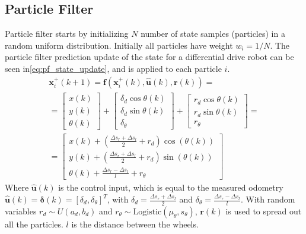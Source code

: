 \subsection{Particle Filter}
Particle filter starts by initializing $N$ number of state samples (particles) in a random uniform distribution. Initially all particles have weight $w_i = 1/N$\:\cite{corke_robotics_2023}.
The particle filter prediction update of the state for a differential drive robot can be seen in\:\eqref{eq:pf_state_update}, and is applied to each particle $i$\:\cite{corke_robotics_2023}.
\begin{equation}
    \label{eq:pf_state_update}
    \begin{split}
        \mathbf{x}_i^+(k+1) = \mathbf{f}(\mathbf{x}^+_i(k), \hat{\mathbf{u}}(k), \mathbf{r}(k)) = \\
        =
        \begin{bmatrix}
            x(k) \\
            y(k) \\
            \theta (k)
        \end{bmatrix}
        +
        \begin{bmatrix}
            \delta_d \cos{\theta(k)} \\
            \delta_d \sin{\theta(k)} \\
            \delta_{\theta}
        \end{bmatrix}
        +
        \begin{bmatrix}
            r_d \cos{\theta(k)} \\
            r_d \sin{\theta(k)} \\
            r_{\theta}
        \end{bmatrix}
        = \\
        =
        \begin{bmatrix}
            x(k) + (\frac{\Delta s_r + \Delta s_l}{2} + r_d) \cos{(\theta (k))} \\
            y(k) + (\frac{\Delta s_r + \Delta s_l}{2} + r_d) \sin{(\theta (k))} \\
            \theta (k) + \frac{\Delta s_r - \Delta s_l}{l} + r_{\theta}
        \end{bmatrix}
    \end{split}
\end{equation}
Where $\hat{\mathbf{u}}(k)$ is the control input, which is equal to the measured odometry $\hat{\mathbf{u}} (k) = \mathbf{\delta} (k) = [\delta_d, \delta_{\theta}]^T$\:\cite{corke_robotics_2023}, with $\delta_d = \frac{\Delta s_r + \Delta s_l}{2}$ and $\delta_{\theta} = \frac{\Delta s_r - \Delta s_l}{l}$. With random variables $r_d \sim U(a_d, b_d)$ and $r_{\theta} \sim \text{Logistic}(\mu_{\theta}, s_{\theta})$, $\mathbf{r}(k)$ is used to spread out all the particles\:\cite{corke_robotics_2023}. $l$ is the distance between the wheels.

